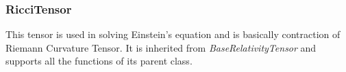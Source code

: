 \documentclass[refree]{aa}
\begin{document}



\subsubsection{RicciTensor}\label{subsubsec:riccitensor}

This tensor is used in solving Einstein's  equation and is basically contraction of Riemann Curvature Tensor.  It is inherited from \textit{BaseRelativityTensor} and supports all the functions of its parent class. 


\end{document}
